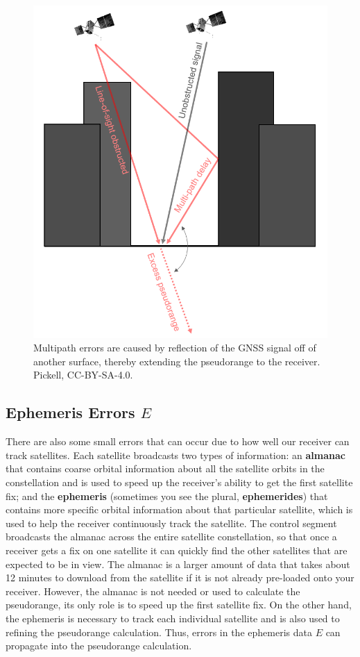 \documentclass[
]{book}
\begin{document}
\begin{figure}
\includegraphics[width=0.75\linewidth]{images/14-GNSS-multipath-error} \caption{Multipath errors are caused by reflection of the GNSS signal off of another surface, thereby extending the pseudorange to the receiver. Pickell, CC-BY-SA-4.0.}\label{fig:14-GNSS-multipath-error}
\end{figure}

\subsection{\texorpdfstring{Ephemeris Errors \(E\)}{Ephemeris Errors E}}\label{ephemeris-errors-e}

There are also some small errors that can occur due to how well our receiver can track satellites. Each satellite broadcasts two types of information: an \textbf{almanac} that contains coarse orbital information about all the satellite orbits in the constellation and is used to speed up the receiver's ability to get the first satellite fix; and the \textbf{ephemeris} (sometimes you see the plural, \textbf{ephemerides}) that contains more specific orbital information about that particular satellite, which is used to help the receiver continuously track the satellite. The control segment broadcasts the almanac across the entire satellite constellation, so that once a receiver gets a fix on one satellite it can quickly find the other satellites that are expected to be in view. The almanac is a larger amount of data that takes about 12 minutes to download from the satellite if it is not already pre-loaded onto your receiver. However, the almanac is not needed or used to calculate the pseudorange, its only role is to speed up the first satellite fix. On the other hand, the ephemeris is necessary to track each individual satellite and is also used to refining the pseudorange calculation. Thus, errors in the ephemeris data \(E\) can propagate into the pseudorange calculation.
\end{document}
